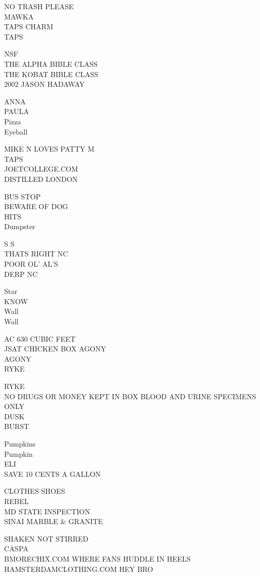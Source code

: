 \documentclass[10pt,letterpaper]{article}
\begin{document}
NO TRASH PLEASE\\
MAWKA\\
TAPS CHARM\\
TAPS

NSF\\
THE ALPHA BIBLE CLASS\\
THE KOBAT BIBLE CLASS\\
2002 JASON HADAWAY

ANNA\\
PAULA\\
Pizza\\
Eyeball

MIKE N LOVES PATTY M\\
TAPS\\
JOETCOLLEGE.COM\\
DISTILLED LONDON

BUS STOP\\
BEWARE OF DOG\\
HITS\\
Dumpster

S S\\
THATS RIGHT NC\\
POOR OL' AL'S\\
DERP NC

Star\\
KNOW\\
Wall\\
Wall

AC 630 CUBIC FEET\\
JSAT CHICKEN BOX AGONY\\
AGONY\\
RYKE

RYKE\\
NO DRUGS OR MONEY KEPT IN BOX BLOOD AND URINE SPECIMENS ONLY\\
DUSK\\
BURST

Pumpkins\\
Pumpkin\\
ELI\\
SAVE 10 CENTS A GALLON

CLOTHES SHOES\\
REBEL\\
MD STATE INSPECTION\\
SINAI MARBLE \& GRANITE

SHAKEN NOT STIRRED\\
CASPA\\
BMORECHIX.COM WHERE FANS HUDDLE IN HEELS\\
HAMSTERDAMCLOTHING.COM HEY BRO
\end{document}

